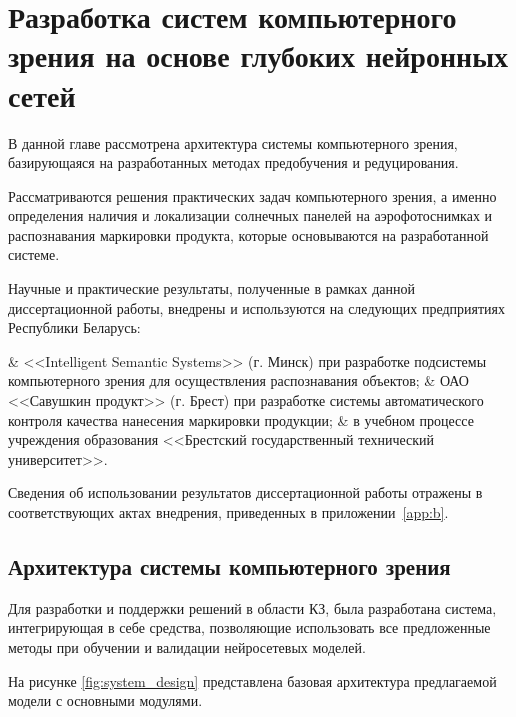 \chapter{Разработка систем компьютерного зрения на основе глубоких нейронных сетей}
\label{chapter4}
В данной главе рассмотрена архитектура системы компьютерного зрения, базирующаяся на разработанных методах предобучения и редуцирования. 

Рассматриваются решения практических задач компьютерного зрения, а именно определения наличия и локализации солнечных панелей на аэрофотоснимках и распознавания маркировки продукта, которые основываются на разработанной системе.

Научные и практические результаты, полученные в рамках данной диссертационной работы, внедрены и используются на следующих предприятиях Республики Беларусь:

\begin{easylist}
	& <<Intelligent Semantic Systems>> (г. Минск) при разработке подсистемы компьютерного зрения для осуществления распознавания объектов;
	& ОАО <<Савушкин продукт>> (г. Брест) при разработке системы автоматического контроля качества нанесения маркировки продукции;
	& в учебном процессе учреждения образования <<Брестский государственный технический университет>>.
 \end{easylist}

Сведения об использовании результатов диссертационной работы отражены в соответствующих актах внедрения, приведенных в приложении~\ref{app:b}.

\section{Архитектура системы компьютерного зрения}
Для разработки и поддержки решений в области КЗ, была разработана система, интегрирующая в себе средства, позволяющие использовать все предложенные методы при обучении и валидации нейросетевых моделей.

На рисунке \ref{fig:system_design} представлена базовая архитектура предлагаемой модели с основными модулями.


